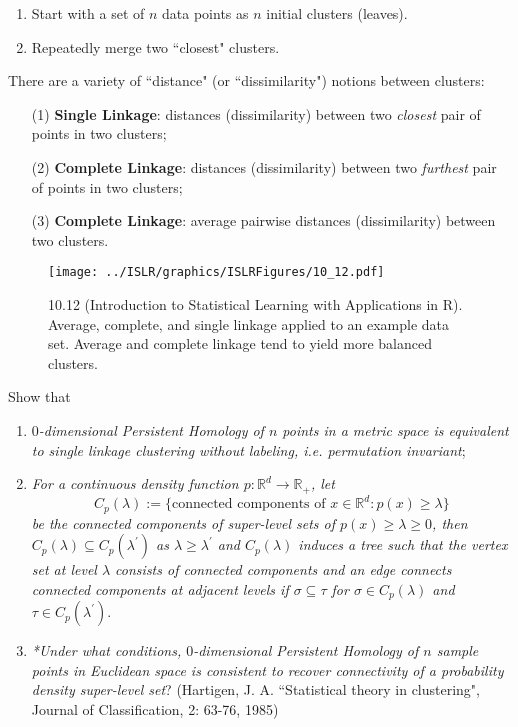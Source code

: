 \documentclass[11pt]{article}
\def\R{{\mathbb R}}
\begin{document}
\begin{enumerate}
\begin{enumerate}
\item Start with a set of $n$ data points as $n$ initial clusters (leaves). 
\item Repeatedly merge two ``closest" clusters.
\end{enumerate}

There are a variety of ``distance" (or ``dissimilarity") notions between clusters:
\begin{enumerate}
\item[(1)] {\bf Single Linkage}: distances (dissimilarity) between two \emph{closest} pair of points in two clusters;
\item[(2)] {\bf Complete Linkage}: distances (dissimilarity) between two \emph{furthest} pair of points in two clusters;
\item[(3)] {\bf Complete Linkage}: average pairwise distances (dissimilarity) between two clusters.
\end{enumerate}

     	\begin{figure}
                   		\centering
                   		\texttt{[image: ../ISLR/graphics/ISLRFigures/10\_12.pdf]}
                   		\caption{\scriptsize 10.12 (Introduction to Statistical Learning with Applications in R). Average, complete, and single linkage applied to an example
                   			data set. Average and complete linkage tend to yield more balanced clusters.
                   		}
        \end{figure}
        
Show that 
\begin{enumerate}
\item \emph{$0$-dimensional Persistent Homology of $n$ points in a metric space is equivalent to single linkage clustering without labeling, i.e. permutation invariant}; 
\item \emph{For a continuous density function $p:\R^d\to \R_+$, let 
$$C_p(\lambda):=\{\mbox{connected components of $x\in\R^d$}: p(x)\geq \lambda\} $$ 
be the connected components of super-level sets of $p(x)\geq \lambda\geq 0$, then $C_p(\lambda)\subseteq C_p(\lambda^\prime)$ as $\lambda \geq \lambda^\prime$ and $C_p(\lambda)$ induces a tree such that the vertex set at level $\lambda$ consists of connected components and an edge connects connected components at adjacent levels if $\sigma \subseteq\tau$ for $\sigma\in C_p(\lambda)$ and $\tau \in C_p(\lambda^\prime)$}. 
\item \emph{*Under what conditions, $0$-dimensional Persistent Homology of $n$ sample points in Euclidean space is consistent to recover connectivity of a probability density super-level set}?  (Hartigen, J. A. ``Statistical theory in clustering", Journal of Classification, 2: 63-76, 1985)
\end{enumerate}


\end{enumerate}
\end{document}
